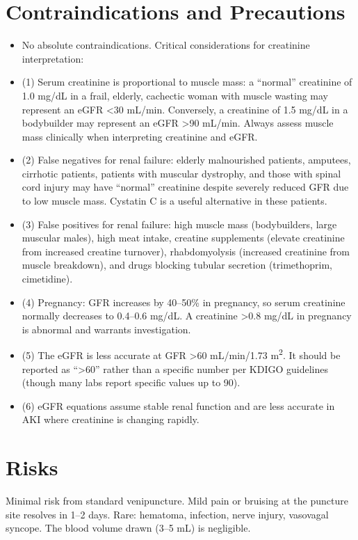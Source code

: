 \section*{Contraindications and Precautions}
\begin{itemize}
  \item No absolute contraindications. Critical considerations for creatinine interpretation:
  \item (1) Serum creatinine is proportional to muscle mass: a ``normal'' creatinine of 1.0 mg/dL in a frail, elderly, cachectic woman with muscle wasting may represent an eGFR <30 mL/min. Conversely, a creatinine of 1.5 mg/dL in a bodybuilder may represent an eGFR >90 mL/min. Always assess muscle mass clinically when interpreting creatinine and eGFR.
  \item (2) False negatives for renal failure: elderly malnourished patients, amputees, cirrhotic patients, patients with muscular dystrophy, and those with spinal cord injury may have ``normal'' creatinine despite severely reduced GFR due to low muscle mass. Cystatin C is a useful alternative in these patients.
  \item (3) False positives for renal failure: high muscle mass (bodybuilders, large muscular males), high meat intake, creatine supplements (elevate creatinine from increased creatine turnover), rhabdomyolysis (increased creatinine from muscle breakdown), and drugs blocking tubular secretion (trimethoprim, cimetidine).
  \item (4) Pregnancy: GFR increases by 40--50\% in pregnancy, so serum creatinine normally decreases to 0.4--0.6 mg/dL. A creatinine >0.8 mg/dL in pregnancy is abnormal and warrants investigation.
  \item (5) The eGFR is less accurate at GFR >60 mL/min/1.73 m\textsuperscript{2}. It should be reported as ``>60'' rather than a specific number per KDIGO guidelines (though many labs report specific values up to 90).
  \item (6) eGFR equations assume stable renal function and are less accurate in AKI where creatinine is changing rapidly.
\end{itemize}
\section*{Risks}
Minimal risk from standard venipuncture. Mild pain or bruising at the puncture site resolves in 1--2 days. Rare: hematoma, infection, nerve injury, vasovagal syncope. The blood volume drawn (3--5 mL) is negligible.

